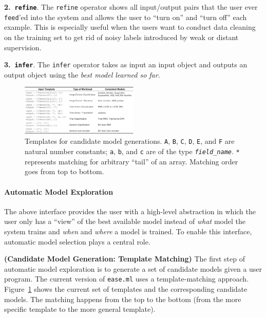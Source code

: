 \documentclass[letterpaper]{vldb}
\newcommand{\eml}{\texttt{ease.ml}\xspace}
\begin{document}
\noindent
{\textbf{2.~\texttt{refine}}.} The \texttt{refine} operator
shows all input/output pairs that the user ever \texttt{feed}'ed
into the system and allows the user to ``turn on''
and ``turn off'' each example. This is especially useful when
the users want to conduct data cleaning on the training set
to get rid of noisy labels introduced by weak or distant supervision.

\noindent
{\textbf{3.~\texttt{infer}}.} The \texttt{infer} operator
takes as input an input object and outputs an output object
using the {\em best model learned so far}.


\begin{figure}[t]
\centering
\includegraphics[width=0.5\textwidth]{figures/models}
\vspace{-2em}
\caption{Templates for candidate model generations. \texttt{A},
\texttt{B}, \texttt{C}, \texttt{D}, \texttt{E}, and \texttt{F}
are natural number constants; \texttt{a}, \texttt{b}, and \texttt{c} are of the type \texttt{\em field\_name}. \texttt{*} represents
matching for arbitrary ``tail'' of an array. Matching order
goes from top to bottom.}
\label{fig:templates}
\vspace{-1em}
\end{figure}


\paragraph*{Automatic Model Exploration}

The above interface provides the user with a high-level abstraction
in which the user only has a ``view'' of the best available model
instead of {\em what} model the system trains and 
{\em when} and {\em where} a model is trained. To enable 
this interface, automatic model selection plays a
central role.

\vspace{0.5em}
\noindent
{\bf (Candidate Model Generation: Template Matching)} 
The first step of automatic
model exploration is to generate a set of 
candidate models given a user program. The current
version of \eml uses a template-matching approach.
Figure~\ref{fig:templates} shows the current set of
templates and the corresponding candidate models. 
The matching happens from the top to the bottom 
(from the more specific template to the more general template).
\end{document}
